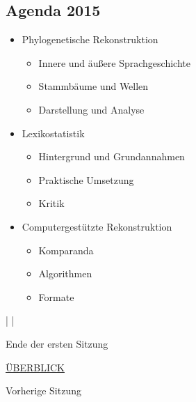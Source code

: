 \subsection{\texorpdfstring{{Agenda 2015}}{Agenda 2015}}

\begin{itemize}
\itemsep1pt\parskip0pt
\item
  {Phylogenetische Rekonstruktion}

  \begin{itemize}
  \itemsep1pt\parskip0pt
  \item
    {Innere und äußere Sprachgeschichte}
  \item
    {Stammbäume und Wellen}
  \item
    {Darstellung und Analyse}
  \end{itemize}
\item
  {Lexikostatistik}

  \begin{itemize}
  \itemsep1pt\parskip0pt
  \item
    {Hintergrund und Grundannahmen}
  \item
    {Praktische Umsetzung}
  \item
    {Kritik}
  \end{itemize}
\item
  {Computergestützte Rekonstruktion}

  \begin{itemize}
  \itemsep1pt\parskip0pt
  \item
    {Komparanda}
  \item
    {Algorithmen}
  \item
    {Formate}
  \end{itemize}
\end{itemize}

\VERB|\NormalTok{>>> } \NormalTok{- }|

Ende der ersten Sitzung

\href{../slides.html}{ÜBERBLICK}



Vorherige Sitzung
